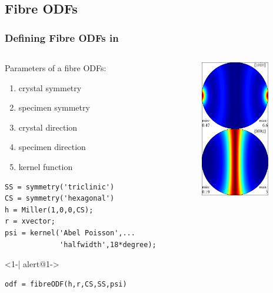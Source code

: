 \subsection*{Fibre ODFs}

\begin{frame}[fragile]
  \frametitle{Defining Fibre ODFs in \MTEX}

  \begin{columns}

    \begin{column}{8.5cm}

      Parameters of a fibre ODFs:
      \begin{enumerate}
      \item crystal symmetry
      \item specimen symmetry
      \item crystal direction
      \item specimen direction
      \item kernel function
      \end{enumerate}


\begin{lstlisting}
SS = symmetry('triclinic')
CS = symmetry('hexagonal')
h = Miller(1,0,0,CS);
r = xvector;
psi = kernel('Abel Poisson',...
             'halfwidth',18*degree);
\end{lstlisting}

      \begin{actionenv}<1-| alert@1->
\begin{lstlisting}
odf = fibreODF(h,r,CS,SS,psi)
\end{lstlisting}
      \end{actionenv}

\end{column}

    \begin{column}{3cm}
      \includegraphics[width=3cm]{pic/fibreODF}
    \end{column}
  \end{columns}


\end{frame}


